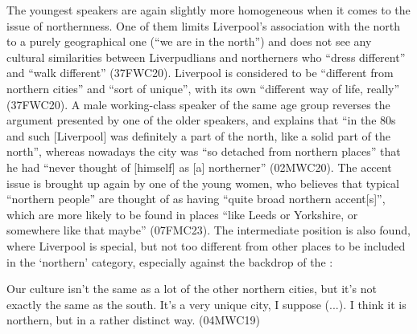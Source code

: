 The youngest speakers are again slightly more homogeneous when it comes to the issue of northernness.
One of them limits Liverpool's association with the north to a purely geographical one (``we are in the north'') and does not see any cultural similarities between Liverpudlians and northerners who ``dress different'' and ``walk different'' (37FWC20).
Liverpool is considered to be ``different from northern cities'' and ``sort of unique'', with its own ``different way of life, really'' (37FWC20).
A male working-class speaker of the same age group reverses the argument presented by one of the older speakers, and explains that ``in the 80s and such [Liverpool] was definitely a part of the north, like a solid part of the north'', whereas nowadays the city was ``so detached from northern places'' that he had ``never thought of [himself] as [a] northerner'' (02MWC20).
The accent issue is brought up again by one of the young women, who believes that typical ``northern people'' are thought of as having ``quite broad northern accent[s]'', which are more likely to be found in places ``like Leeds or Yorkshire, or somewhere like that maybe'' (07FMC23).
The intermediate position is also found, where Liverpool is special, but not too different from other places to be included in the `northern' category, especially against the backdrop of the :
\begin{example}
	Our culture isn't the same as a lot of the other northern cities, but it's not exactly the same as the south.
	It's a very unique city, I suppose (...).
	I think it is northern, but in a rather distinct way. (04MWC19)
\end{example}

